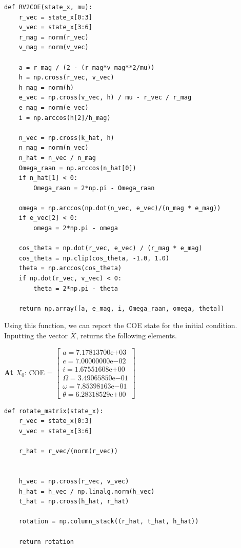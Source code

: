 \documentclass[12pt,twocolumn]{article}  %
\begin{document}
\begin{lstlisting}
def RV2COE(state_x, mu):
    r_vec = state_x[0:3]
    v_vec = state_x[3:6]
    r_mag = norm(r_vec)
    v_mag = norm(v_vec)
    
    a = r_mag / (2 - (r_mag*v_mag**2/mu))
    h = np.cross(r_vec, v_vec)
    h_mag = norm(h)
    e_vec = np.cross(v_vec, h) / mu - r_vec / r_mag
    e_mag = norm(e_vec)
    i = np.arccos(h[2]/h_mag)
    
    n_vec = np.cross(k_hat, h)
    n_mag = norm(n_vec)
    n_hat = n_vec / n_mag
    Omega_raan = np.arccos(n_hat[0])
    if n_hat[1] < 0:
        Omega_raan = 2*np.pi - Omega_raan
    
    omega = np.arccos(np.dot(n_vec, e_vec)/(n_mag * e_mag))
    if e_vec[2] < 0:
        omega = 2*np.pi - omega
        
    cos_theta = np.dot(r_vec, e_vec) / (r_mag * e_mag)
    cos_theta = np.clip(cos_theta, -1.0, 1.0)  
    theta = np.arccos(cos_theta)
    if np.dot(r_vec, v_vec) < 0:
        theta = 2*np.pi - theta
    
    return np.array([a, e_mag, i, Omega_raan, omega, theta])
\end{lstlisting}

Using this function, we can report the COE state for the initial condition. Inputting the vector $\bar{X}$, returns the following elements.

\begin{center}
    \textbf{At } $X_0$:
    COE =
    $\begin{bmatrix}
    a = 7.17813700\mathrm{e}{+03} \\
    e =  7.00000000\mathrm{e}{-02} \\
    i = 1.67551608\mathrm{e}{+00} \\
    \Omega = 3.49065850\mathrm{e}{-01} \\
    \omega = 7.85398163\mathrm{e}{-01} \\
    \theta = 6.28318529\mathrm{e}{+00}
    \end{bmatrix}$  
\end{center}

\begin{lstlisting}
def rotate_matrix(state_x):
    r_vec = state_x[0:3]
    v_vec = state_x[3:6]
    
    r_hat = r_vec/(norm(r_vec))
    

    h_vec = np.cross(r_vec, v_vec)
    h_hat = h_vec / np.linalg.norm(h_vec)  
    t_hat = np.cross(h_hat, r_hat)  

    rotation = np.column_stack((r_hat, t_hat, h_hat))
    
    return rotation
\end{lstlisting}
\end{document}
